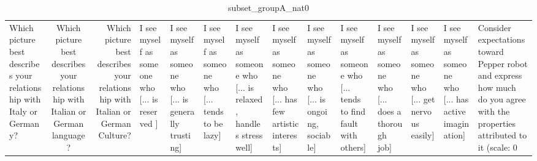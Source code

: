 \begin{table}
\caption{subset_groupA_nat0}
\label{tab:subset_groupA_nat0}
\begin{tabular}{lcr}
\toprule
Which picture best describes your relationship with Italy or Germany? & Which picture best describes your relationship with Italian or German language? & Which picture best describes your relationship with Italian or German Culture? & I see myself as someone who  [... is reserved ] & I see myself as someone who  [... is generally trusting] & I see myself as someone who  [... tends to be lazy] & I see myself as someone who  [... is relaxed, handles stress well] & I see myself as someone who  [... has few artistic interests] & I see myself as someone who  [... is ongoing, sociable] & I see myself as someone who  [... tends to find fault with others] & I see myself as someone who  [... does a thorough job] & I see myself as someone who  [... get nervous easily] & I see myself as someone who  [... has active imagination] & Consider expectations toward Pepper robot and express how much do you agree with the properties attributed to it (scale: 0%
\end{tabular}
\end{table}
